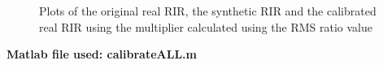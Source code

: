 \documentclass[../../main.tex]{subfiles}
\begin{document}
\begin{figure}[H]
\begin{center}
			\caption{Plots of the original real \ac{RIR}, the synthetic \ac{RIR} and the calibrated real \ac{RIR} using the multiplier calculated using the RMS ratio value}
			\label{calRMS}
		\end{center}
	\end{figure}



	\textbf{Matlab file used: calibrateALL.m}






\end{document}
